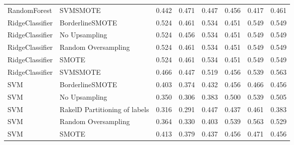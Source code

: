 \begin{tabular}{llllllll}
                   RandomForest &                      SVMSMOTE & 0.442 &                     0.471 &                 0.447 &                  0.456 &                                   0.417 &     0.461 \\
                RidgeClassifier &               BorderlineSMOTE & 0.524 &                     0.461 &                 0.534 &                  0.451 &                                   0.549 &     0.549 \\
                RidgeClassifier &                 No Upsampling & 0.524 &                     0.456 &                 0.534 &                  0.451 &                                   0.549 &     0.549 \\
                RidgeClassifier &           Random Oversampling & 0.524 &                     0.461 &                 0.534 &                  0.451 &                                   0.549 &     0.549 \\
                RidgeClassifier &                         SMOTE & 0.524 &                     0.461 &                 0.534 &                  0.451 &                                   0.549 &     0.549 \\
                RidgeClassifier &                      SVMSMOTE & 0.466 &                     0.447 &                 0.519 &                  0.456 &                                   0.539 &     0.563 \\
                            SVM &               BorderlineSMOTE & 0.403 &                     0.374 &                 0.432 &                  0.456 &                                   0.466 &     0.456 \\
                            SVM &                 No Upsampling & 0.350 &                     0.306 &                 0.383 &                  0.500 &                                   0.539 &     0.505 \\
                            SVM & RakelD Partitioning of labels & 0.316 &                     0.291 &                 0.447 &                  0.437 &                                   0.461 &     0.383 \\
                            SVM &           Random Oversampling & 0.364 &                     0.330 &                 0.403 &                  0.539 &                                   0.563 &     0.529 \\
                            SVM &                         SMOTE & 0.413 &                     0.379 &                 0.437 &                  0.456 &                                   0.471 &     0.456 \\

\end{tabular}
